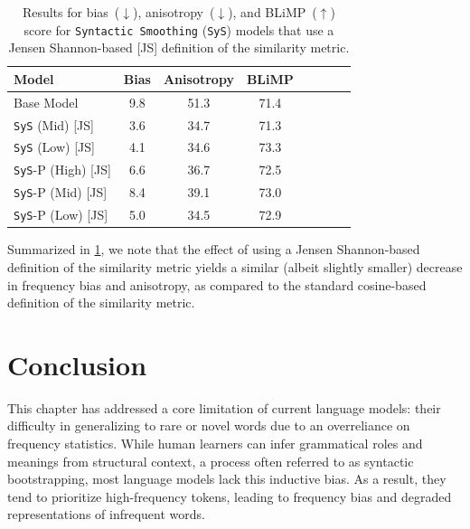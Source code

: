 \begin{table}[ht!]
\centering
\small
\begin{tabular}{l||cc|ccccc}
\toprule
\textbf{Model}  &  \textbf{Bias}  & \textbf{Anisotropy} & \textbf{BLiMP} \\
\midrule
Base Model & 9.8 & 51.3 & 71.4  \\
\midrule
\texttt{SyS} (Mid) \hspace{0.42cm} [JS]  & 3.6 & 34.7 & 71.3 \\
\texttt{SyS} (Low) \hspace{0.38cm} [JS]  & 4.1 & 34.6 & 73.3  \\
\texttt{SyS}-P (High) \hspace{0.05cm} [JS] & 6.6 & 36.7  & 72.5  \\ 
\texttt{SyS}-P (Mid) \hspace{0.15cm} [JS] & 8.4 & 39.1 &  73.0 \\ 
\texttt{SyS}-P (Low) \hspace{0.12cm} [JS] & 5.0 &  34.5 & 72.9 \\ 
\bottomrule
\end{tabular}
\caption{\label{tbl:jsd-similarity-metric-results}
Results for bias~($\downarrow$), anisotropy~($\downarrow$), and BLiMP~($\uparrow$) score for \texttt{Syntactic Smoothing} (\texttt{SyS}) models that use a Jensen Shannon-based [JS] definition of the similarity metric.}
\end{table}

Summarized in \cref{tbl:jsd-similarity-metric-results}, we note that the effect of using a Jensen Shannon-based definition of the similarity metric yields a similar (albeit slightly smaller) decrease in frequency bias and anisotropy, as compared to the standard cosine-based definition of the similarity metric.   

\section{Conclusion}
\label{sec:conclusion}

This chapter has addressed a core limitation of current language models: their difficulty in generalizing to rare or novel words due to an overreliance on frequency statistics. While human learners can infer grammatical roles and meanings from structural context, a process often referred to as syntactic bootstrapping, most language models lack this inductive bias. As a result, they tend to prioritize high-frequency tokens, leading to frequency bias and degraded representations of infrequent words.

